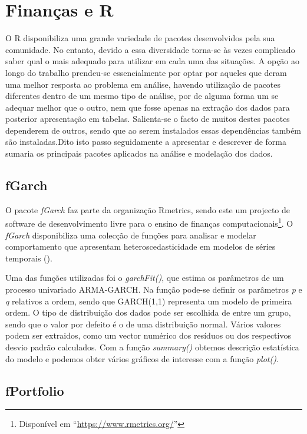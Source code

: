 \documentclass[
  12pt,
  a4paper,
  openany]{book}
\begin{document}
\hypertarget{finanuxe7as-e-r}{%
\section{Finanças e R}\label{finanuxe7as-e-r}}

O R disponibiliza uma grande variedade de pacotes desenvolvidos pela sua comunidade. No entanto, devido a essa diversidade torna-se às vezes complicado saber qual o mais adequado para utilizar em cada uma das situações. A opção ao longo do trabalho prendeu-se essencialmente por optar por aqueles que deram uma melhor resposta ao problema em análise, havendo utilização de pacotes diferentes dentro de um mesmo tipo de análise, por de alguma forma um se adequar melhor que o outro, nem que fosse apenas na extração dos dados para posterior apresentação em tabelas. Salienta-se o facto de muitos destes pacotes dependerem de outros, sendo que ao serem instalados essas dependências também são instaladas.Dito isto passo seguidamente a apresentar e descrever de forma sumaria os principais pacotes aplicados na análise e modelação dos dados.

\hypertarget{fgarch}{%
\subsection{fGarch}\label{fgarch}}

O pacote \emph{fGarch} faz parte da organização Rmetrics, sendo este um projecto de software de desenvolvimento livre para o ensino de finanças computacionais\footnote{Disponível em ``\url{https://www.rmetrics.org/}''}. O \emph{fGarch} disponibiliza uma colecção de funções para analisar e modelar comportamento que apresentam heteroscedasticidade em modelos de séries temporais (\citet{fGarch}).

Uma das funções utilizadas foi o \emph{garchFit()}, que estima os parâmetros de um processo univariado ARMA-GARCH. Na função pode-se definir os parâmetros \emph{p} e \emph{q} relativos a ordem, sendo que GARCH(1,1) representa um modelo de primeira ordem. O tipo de distribuição dos dados pode ser escolhida de entre um grupo, sendo que o valor por defeito é o de uma distribuição normal. Vários valores podem ser extraidos, como um vector numérico dos resíduos ou dos respectivos desvio padrão calculados. Com a função \emph{summary()} obtemos descrição estatística do modelo e podemos obter vários gráficos de interesse com a função \emph{plot()}.

\hypertarget{fportfolio}{%
\subsection{fPortfolio}\label{fportfolio}}
\end{document}

